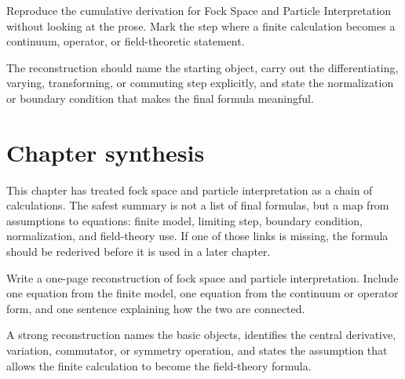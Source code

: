\begin{exercise}
Reproduce the cumulative derivation for Fock Space and Particle Interpretation without looking at the prose.  Mark the step where a finite calculation becomes a continuum, operator, or field-theoretic statement.
\begin{answer}
The reconstruction should name the starting object, carry out the differentiating, varying, transforming, or commuting step explicitly, and state the normalization or boundary condition that makes the final formula meaningful.
\end{answer}
\end{exercise}



\section{Chapter synthesis}

This chapter has treated fock space and particle interpretation as a chain of calculations.  The safest summary is not a list of final formulas, but a map from assumptions to equations: finite model, limiting step, boundary condition, normalization, and field-theory use.  If one of those links is missing, the formula should be rederived before it is used in a later chapter.

\begin{exercise}
Write a one-page reconstruction of fock space and particle interpretation.  Include one equation from the finite model, one equation from the continuum or operator form, and one sentence explaining how the two are connected.
\begin{answer}
A strong reconstruction names the basic objects, identifies the central derivative, variation, commutator, or symmetry operation, and states the assumption that allows the finite calculation to become the field-theory formula.
\end{answer}
\end{exercise}
